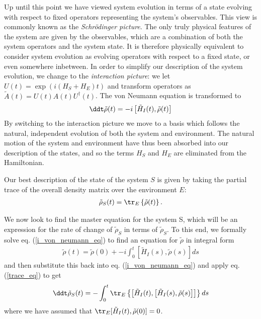 Up until this point we have viewed system evolution in terms of a state evolving with respect to fixed operators representing the system's observables. This view is commonly known as the \textit{Schr\"odinger picture}. The only truly physical features of the system are given by the observables, which are a combination of both the system operators and the system state. It is therefore physically equivalent to consider system evolution as evolving operators with respect to a fixed state, or even somewhere inbetween. In order to simplify our description of the system evolution, we change to the \textit{interaction picture}: we let $U(t) = \exp(i(H_S + H_E)t)$ and transform operators as $\tilde{A}(t) = U(t)A(t)U^\dagger(t)$. The von Neumann equation is transformed to
\begin{align}
  \label{i_von_neumann_eq}
  \ddt \tilde{\rho}(t) = -i\left[ \tilde{H}_I(t), \tilde{\rho}(t) \right]
\end{align}
By switching to the interaction picture we move to a basis which follows the natural, independent evolution of both the system and environment. The natural motion of the system and environment have thus been absorbed into our description of the states, and so the terms $H_S$ and $H_E$ are eliminated from the Hamiltonian.

Our best description of the state of the system $S$ is given by taking the partial trace of the overall density matrix over the environment $E$:
\begin{align}
  \label{trace_eq}
  \tilde{\rho}_S(t) = \tr_E\left\{\tilde{\rho}(t)\right\}.
\end{align}

We now look to find the master equation for the system S, which will be an expression for the rate of change of $\tilde{\rho}_S$ in terms of $\tilde{\rho}_S$. To this end, we formally solve eq. (\ref{i_von_neumann_eq}) to find an equation for $\tilde{\rho}$ in integral form
\begin{align}
  \tilde{\rho}(t) = \tilde{\rho}(0) + -i\int_{0}^t \left[ \tilde{H}_I(s), \tilde{\rho}(s) \right] ds
\end{align}
and then substitute this back into eq. (\ref{i_von_neumann_eq}) and apply eq. (\ref{trace_eq}) to get
\begin{align}
  \label{before_markov_approx}
  \ddt \tilde{\rho}_S(t) = -\int_{0}^t \tr_E\left\{ \left[ \tilde{H}_I(t), \left[ \tilde{H}_I(s), \tilde{\rho}(s) \right] \right] \right\} ds
\end{align}
where we have assumed that $\tr_E [\tilde{H}_I(t), \tilde{\rho}(0)] = 0$.

